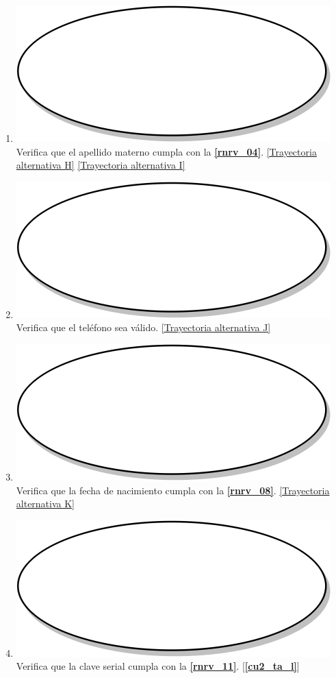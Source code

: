\begin{enumerate}
  \item {\includegraphics[scale=.05]{Capitulo3/img/proceso.png} Verifica que el apellido materno cumpla con la \textbf{\ref{rnrv_04}}. \hyperref[cu2_ta_h]{[Trayectoria alternativa H]} \hyperref[cu2_ta_i]{[Trayectoria alternativa I]}}
  \item {\includegraphics[scale=.05]{Capitulo3/img/proceso.png} Verifica que el teléfono sea válido. \hyperref[cu2_ta_j]{[Trayectoria alternativa J]}}
  \item {\includegraphics[scale=.05]{Capitulo3/img/proceso.png} Verifica que la fecha de nacimiento cumpla con la \textbf{\ref{rnrv_08}}. \hyperref[cu2_ta_k]{[Trayectoria alternativa K]}}
  \item {\includegraphics[scale=.05]{Capitulo3/img/proceso.png} Verifica que la clave serial cumpla con la \textbf{\ref{rnrv_11}}. [\textbf{\ref{cu2_ta_l}}]}

\end{enumerate}
